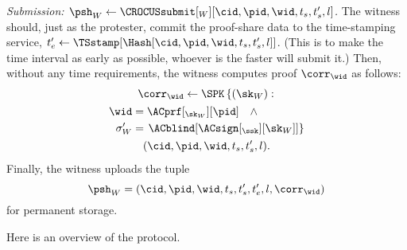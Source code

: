 \emph{Submission: \(\psh_W\gets \CROCUSsubmit[_W][\cid, \pid, \wid, t_s, t_s', 
    l]\).}
The witness should, just as the protester, commit the proof-share data to the 
time-stamping service, \(t_e'\gets \TSstamp[\Hash[\cid, \pid, \wid, t_s, t_s', 
  l]]\).
(This is to make the time interval as early as possible, whoever is the faster 
will submit it.)
Then, without any time requirements, the witness computes  proof 
\(\corr_{\wid}\) as follows:
\begin{multline*}
  \corr_{\wid}\gets \SPK\left\{ (\sk_W) : \right. \\
    \begin{aligned}
      \wid &= \ACprf[_{\sk_W}][\pid] \quad \land \\
      \sigma_W' &= \left. \ACblind[\ACsign[_{\ssk}][\sk_W]] \right\}
    \end{aligned} \\
      (\cid, \pid, \wid, t_s, t_s', l).
\end{multline*}
Finally, the witness uploads the tuple \[
  \psh_W = (\cid, \pid, \wid, t_s, t_s', t_e', l, \corr_{\wid})
\] for permanent storage.


Here is an overview of the protocol.


